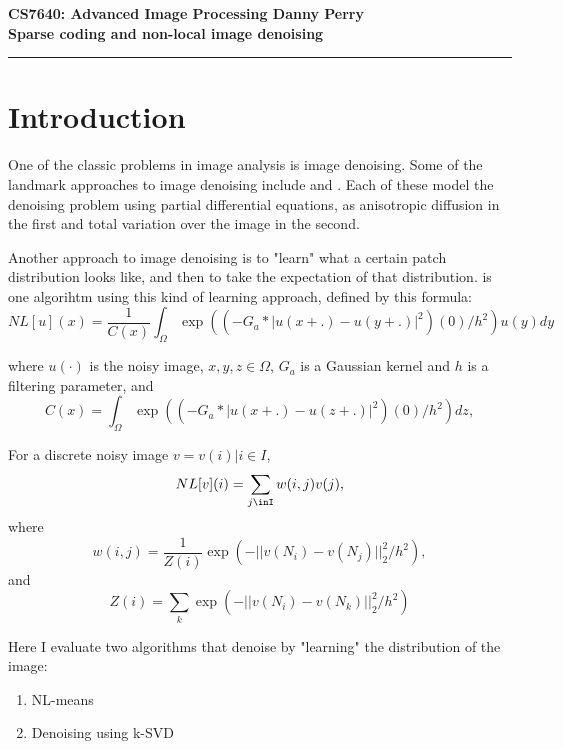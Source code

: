 \documentclass[11pt]{article}
\begin{document}
\thispagestyle{empty}
{\large{\bf CS7640: Advanced Image Processing \hfill Danny Perry}}\\

{\LARGE{\bf Sparse coding and non-local image denoising}}
\vspace{0.2\baselineskip}
\hrule

\section{Introduction}
One of the classic problems in image analysis is image denoising.
Some of the landmark approaches to image denoising include \cite{perona1990scale} and \cite{rudin1992nonlinear}.
Each of these model the denoising problem using partial differential equations, as anisotropic diffusion in the first and total variation over the image in the second. 

Another approach to image denoising is to "learn" what a certain patch distribution looks like, and then to take the expectation of that distribution.
\cite{buades2005non} is one algorihtm using this kind of learning approach, defined by this formula:
\begin{equation}
NL[u](x) = \frac{1}{C(x)} \int_{\Omega} \exp( (-G_a*|u(x+.)-u(y+.)|^2)(0) / h^2 ) u(y) dy
\end{equation}

where $u(\cdot)$ is the noisy image, $x,y,z\in \Omega$, $G_a$ is a Gaussian kernel and $h$ is a filtering parameter, and 
\begin{equation*}
C(x) = \int_{\Omega} \exp( (-G_a*|u(x+.)-u(z+.)|^2)(0) / h^2 ) dz,
\end{equation*}

For a discrete noisy image $v = {v(i) | i \in I}$,
\begin{equation}
NL[v](i) = \sum_{j\inI} w(i,j) v(j),
\end{equation}
where
\begin{equation*}
w(i,j) = \frac{1}{Z(i)} \exp( -||v(N_i)-v(N_j)||_2^2 / h^2 ),
\end{equation*}
and
\begin{equation*}
Z(i) = \sum_k \exp( -||v(N_i)-v(N_k)||_2^2 / h^2 )
\end{equation*}



Here I evaluate two algorithms that denoise by "learning" the distribution of the image:
\begin{enumerate}
\item NL-means
\item Denoising using k-SVD
\end{enumerate}
\end{document}

